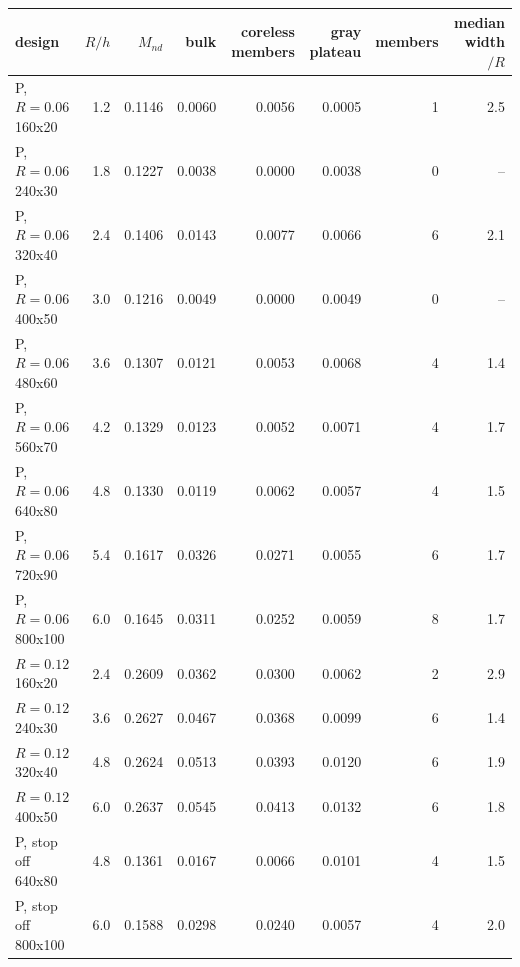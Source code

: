 \setlength{\tabcolsep}{3.5pt}
\begin{tabular}{lrrrrrrr}
\toprule
design & $R/h$ & $M_{nd}$ & bulk & coreless members & gray plateau & members & median width$/R$ \\
\midrule
P, $R=0.06$ 160x20 & 1.2 & 0.1146 & 0.0060 & 0.0056 & 0.0005 & 1 & 2.5 \\
P, $R=0.06$ 240x30 & 1.8 & 0.1227 & 0.0038 & 0.0000 & 0.0038 & 0 & -- \\
P, $R=0.06$ 320x40 & 2.4 & 0.1406 & 0.0143 & 0.0077 & 0.0066 & 6 & 2.1 \\
P, $R=0.06$ 400x50 & 3.0 & 0.1216 & 0.0049 & 0.0000 & 0.0049 & 0 & -- \\
P, $R=0.06$ 480x60 & 3.6 & 0.1307 & 0.0121 & 0.0053 & 0.0068 & 4 & 1.4 \\
P, $R=0.06$ 560x70 & 4.2 & 0.1329 & 0.0123 & 0.0052 & 0.0071 & 4 & 1.7 \\
P, $R=0.06$ 640x80 & 4.8 & 0.1330 & 0.0119 & 0.0062 & 0.0057 & 4 & 1.5 \\
P, $R=0.06$ 720x90 & 5.4 & 0.1617 & 0.0326 & 0.0271 & 0.0055 & 6 & 1.7 \\
P, $R=0.06$ 800x100 & 6.0 & 0.1645 & 0.0311 & 0.0252 & 0.0059 & 8 & 1.7 \\
$R=0.12$ 160x20 & 2.4 & 0.2609 & 0.0362 & 0.0300 & 0.0062 & 2 & 2.9 \\
$R=0.12$ 240x30 & 3.6 & 0.2627 & 0.0467 & 0.0368 & 0.0099 & 6 & 1.4 \\
$R=0.12$ 320x40 & 4.8 & 0.2624 & 0.0513 & 0.0393 & 0.0120 & 6 & 1.9 \\
$R=0.12$ 400x50 & 6.0 & 0.2637 & 0.0545 & 0.0413 & 0.0132 & 6 & 1.8 \\
P, stop off 640x80 & 4.8 & 0.1361 & 0.0167 & 0.0066 & 0.0101 & 4 & 1.5 \\
P, stop off 800x100 & 6.0 & 0.1588 & 0.0298 & 0.0240 & 0.0057 & 4 & 2.0 \\
\bottomrule
\end{tabular}
